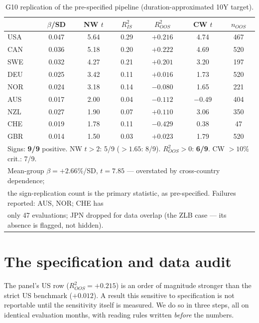 \documentclass[11pt]{article}
\begin{document}
\begin{table}[t]\centering
\caption{G10 replication of the pre-specified pipeline (duration-approximated 10Y target).}
\label{tab:panel}
\begin{tabular}{lcccccc}
\toprule
 & $\beta$/SD & NW $t$ & $R^2_{IS}$ & $R^2_{OOS}$ & CW $t$ & $n_{OOS}$ \\
\midrule
USA & 0.047 & 5.64 & 0.29 & $+0.216$ & 4.74 & 467 \\
CAN & 0.036 & 5.18 & 0.20 & $+0.222$ & 4.69 & 520 \\
SWE & 0.032 & 4.27 & 0.21 & $+0.201$ & 3.20 & 197 \\
DEU & 0.025 & 3.42 & 0.11 & $+0.016$ & 1.73 & 520 \\
NOR & 0.024 & 3.18 & 0.14 & $-0.080$ & 1.65 & 221 \\
AUS & 0.017 & 2.00 & 0.04 & $-0.112$ & $-0.49$ & 404 \\
NZL & 0.027 & 1.90 & 0.07 & $+0.110$ & 3.06 & 350 \\
CHE & 0.019 & 1.78 & 0.11 & $-0.429$ & 0.38 & 47 \\
GBR & 0.014 & 1.50 & 0.03 & $+0.023$ & 1.79 & 520 \\
\midrule
\multicolumn{7}{l}{\footnotesize Signs: \textbf{9/9} positive. NW $t>2$: 5/9 ($>1.65$: 8/9).
$R^2_{OOS}>0$: \textbf{6/9}. CW $>10\%$ crit.: 7/9.}\\
\multicolumn{7}{l}{\footnotesize Mean-group $\beta=+2.66\%$/SD, $t=7.85$
\citep{pesaransmith} --- overstated by cross-country dependence;}\\
\multicolumn{7}{l}{\footnotesize the sign-replication count is the primary statistic, as
pre-specified. Failures reported: AUS, NOR; CHE has}\\
\multicolumn{7}{l}{\footnotesize only 47 evaluations; JPN dropped for data overlap (the ZLB
case --- its absence is flagged, not hidden).}\\
\bottomrule
\end{tabular}
\end{table}

\section{The specification and data audit}\label{sec:audit}

The panel's US row ($R^2_{OOS}=+0.215$) is an order of magnitude stronger than the strict
US benchmark ($+0.012$). A result this sensitive to specification is not reportable until
the sensitivity itself is measured. We do so in three steps, all on identical evaluation
months, with reading rules written \emph{before} the numbers.
\end{document}
